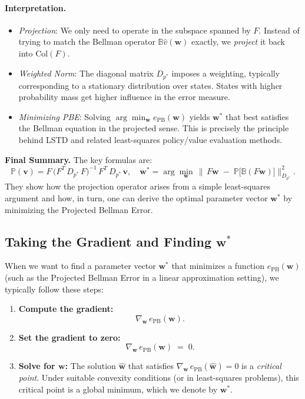 \paragraph{Interpretation.}
\begin{itemize}
    \item \emph{Projection}: We only need to operate in the subspace spanned by $F$. Instead of trying to match the Bellman operator $\mathbb{B}\hat{v}(\boldsymbol{w})$ exactly, we \emph{project} it back into $\text{Col}(F)$.
    \item \emph{Weighted Norm}: The diagonal matrix $D_{p^*}$ imposes a weighting, typically corresponding to a stationary distribution over states. States with higher probability mass get higher influence in the error measure.
    \item \emph{Minimizing PBE}: Solving $\arg\min_{\boldsymbol{w}} e_{\mathrm{PB}}(\boldsymbol{w})$ yields $\boldsymbol{w}^*$ that best satisfies the Bellman equation in the projected sense. This is precisely the principle behind LSTD and related least-squares policy/value evaluation methods.
\end{itemize}

\noindent
\textbf{Final Summary.}  
The key formulas are:
\[
\boxed{
\mathbb{P}(\boldsymbol{v}) 
= 
F \,\bigl(F^T\,D_{p^*}\,F\bigr)^{-1}\,F^T\,D_{p^*}\,\boldsymbol{v},
\quad
\boldsymbol{w}^*
= 
\arg\min_{\boldsymbol{w}}\,
\bigl\|\,
F \boldsymbol{w}
\;-\;
\mathbb{P}\bigl[\mathbb{B}(F \boldsymbol{w})\bigr]
\bigr\|_{D_{p^*}}^2.
}
\]
They show how the projection operator arises from a simple least-squares argument and how, in turn, one can derive the optimal parameter vector $\boldsymbol{w}^*$ by minimizing the Projected Bellman Error.

\subsection{Taking the Gradient and Finding \texorpdfstring{$\boldsymbol{w}^*$}{w*}}

When we want to find a parameter vector $\boldsymbol{w}^*$ that minimizes a function $e_{\mathrm{PB}}(\boldsymbol{w})$
(such as the Projected Bellman Error in a linear approximation setting), we typically follow these steps:

\begin{enumerate}
    \item \textbf{Compute the gradient:} 
    \[
    \nabla_{\boldsymbol{w}} \, e_{\mathrm{PB}}(\boldsymbol{w}).
    \]
    \item \textbf{Set the gradient to zero:} 
    \[
    \nabla_{\boldsymbol{w}} \, e_{\mathrm{PB}}(\boldsymbol{w}) \;=\; 0.
    \]
    \item \textbf{Solve for $\boldsymbol{w}$:} 
    The solution $\widehat{\boldsymbol{w}}$ that satisfies $\nabla_{\boldsymbol{w}} \, e_{\mathrm{PB}}(\widehat{\boldsymbol{w}}) = 0$
    is a \emph{critical point}. Under suitable convexity conditions (or in least-squares problems),
    this critical point is a global minimum, which we denote by $\boldsymbol{w}^*$.
\end{enumerate}

